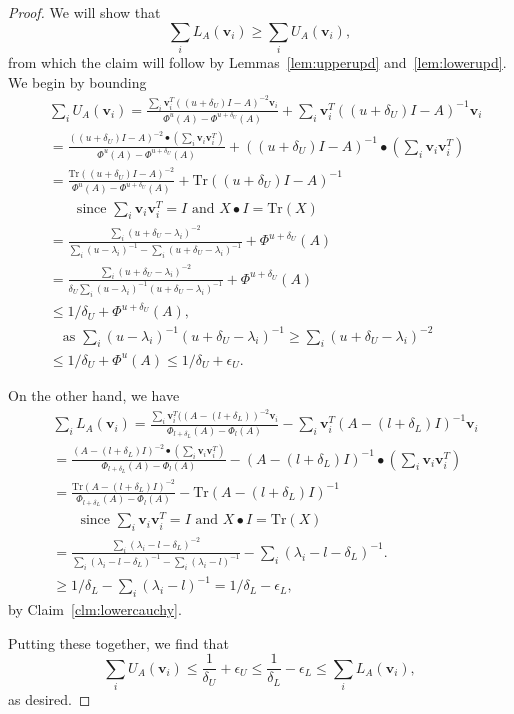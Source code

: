 \documentclass[12pt]{article}
\newcommand{\deltaL}{\delta_{L}}
\newcommand{\deltaU}{\delta_{U}}
\newcommand{\epsL}{\epsilon_{L}}
\newcommand{\epsU}{\epsilon_{U}}
\newcommand{\tr}{\mathrm{Tr}}
\newcommand\ppi{\mathbf{v}}
\begin{document}
\begin{proof}
We will show that
\[
  \sum_i L_A(\ppi_{i})\ge\sum_i U_A(\ppi_{i}),
\]
 from which the claim will follow by Lemmas~\ref{lem:upperupd} and~\ref{lem:lowerupd}.
We begin by bounding
\begin{align*}
&\sum_i U_A(\ppi_{i}) 
=\frac{
 \sum_i \ppi_{i}^{T} ((u+\deltaU)I-A)^{-2}\ppi_{i}}
  {\Phi^u(A)-\Phi^{u+\deltaU}(A)}
  +\sum_i \ppi_{i}^{T} ((u+\deltaU)I-A)^{-1}\ppi_{i}
\\&=\frac{
   ((u+\deltaU)I-A)^{-2}\bullet(\sum_i\ppi_{i}\ppi_{i}^{T} )}
  {\Phi^u(A)-\Phi^{u+\deltaU}(A)}
  +((u+\deltaU)I-A)^{-1}\bullet\left(\sum_i\ppi_{i}\ppi_{i}^{T} \right)
\\&=\frac{
   \tr((u+\deltaU)I-A)^{-2}}
  {\Phi^u(A)-\Phi^{u+\deltaU}(A)}
  +\tr((u+\deltaU)I-A)^{-1}
\\&\qquad\textrm{since $\sum_i \ppi_{i}\ppi_{i}^{T} =I$ and $X\bullet I=\tr(X)$}
\\&= \frac{
 \sum_i (u+\deltaU-\lambda_i)^{-2}
}{
 \sum_i (u-\lambda_i)^{-1} -\sum_i (u+\deltaU-\lambda_i)^{-1}}
  +\Phi^{u+\deltaU}(A)
\\&= \frac{
 \sum_i (u+\deltaU-\lambda_i)^{-2}}
  {\deltaU \sum_i (u-\lambda_i)^{-1}(u+\deltaU-\lambda_i)^{-1}}
  +\Phi^{u+\deltaU}(A)
\\&\le 1/\deltaU
  +\Phi^{u+\deltaU}(A),
\\&\quad\textrm{as $\sum_i (u-\lambda_i)^{-1}(u+\deltaU-\lambda_i)^{-1}\ge
\sum_i (u+\deltaU-\lambda_i)^{-2}$}
\\&\le 1/\deltaU+\Phi^{u}(A)\le 1/\deltaU+\epsU.
\end{align*}

On the other hand, we have
\begin{align*}
&\sum_i L_A(\ppi_i) 
=\frac{
 \sum_i \ppi_{i}^{T} ((A-(l+\deltaL))^{-2}\ppi_{i}}
  {\Phi_{l+\deltaL}(A)-\Phi_l(A)}
  -\sum_i \ppi_{i}^{T} (A-(l+\deltaL)I)^{-1}\ppi_{i}
\\&=\frac{
   (A-(l+\deltaL)I)^{-2}\bullet(\sum_i\ppi_{i}\ppi_{i}^{T} )}
  {\Phi_{l+\deltaL}(A)-\Phi_l(A)}
  -(A-(l+\deltaL)I)^{-1}\bullet\left(\sum_i\ppi_{i}\ppi_{i}^{T} \right)
\\&=\frac{
   \tr(A-(l+\deltaL)I)^{-2}}
  {\Phi_{l+\deltaL}(A)-\Phi_l(A)}
  -\tr(A-(l+\deltaL)I)^{-1}
\\&\qquad\textrm{since $\sum_i \ppi_{i}\ppi_{i}^{T} =I$ and $X\bullet I=\tr(X)$}
\\&=\frac{
 \sum_i (\lambda_i-l-\deltaL)^{-2}}
  {\sum_i (\lambda_i-l-\deltaL)^{-1}- \sum_i (\lambda_i-l)^{-1}
  }
  -\sum_i (\lambda_i-l-\deltaL)^{-1}.
\\
& \geq 1/ \deltaL -\sum_i (\lambda_i-l)^{-1}
 = 1/\deltaL - \epsilon_L,
\end{align*}
by Claim~\ref{clm:lowercauchy}. 

Putting these together, we find that 
\[ \sum_i U_A(\ppi_{i})\le
\frac{1}{\deltaU}+\epsU\le\frac{1}{\deltaL}-\epsL\le\sum_i
L_A(\ppi_{i}),\] as desired.
\end{proof}
\end{document}
